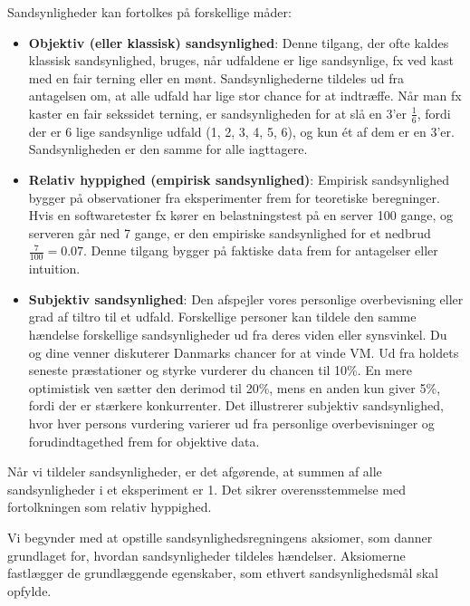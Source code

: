 Sandsynligheder kan fortolkes på forskellige måder:

\begin{itemize}
    \item \textbf{Objektiv (eller klassisk) sandsynlighed}: Denne tilgang, der ofte kaldes klassisk sandsynlighed, bruges, når udfaldene er lige sandsynlige, fx ved kast med en fair terning eller en mønt. Sandsynlighederne tildeles ud fra antagelsen om, at alle udfald har lige stor chance for at indtræffe. Når man fx kaster en fair sekssidet terning, er sandsynligheden for at slå en 3'er \( \frac{1}{6} \), fordi der er 6 lige sandsynlige udfald (1, 2, 3, 4, 5, 6), og kun ét af dem er en 3'er. Sandsynligheden er den samme for alle iagttagere.
        
    \item \textbf{Relativ hyppighed (empirisk sandsynlighed)}: Empirisk sandsynlighed bygger på observationer fra eksperimenter frem for teoretiske beregninger. Hvis en softwaretester fx kører en belastningstest på en server 100 gange, og serveren går ned 7 gange, er den empiriske sandsynlighed for et nedbrud \( \frac{7}{100} = 0.07 \). Denne tilgang bygger på faktiske data frem for antagelser eller intuition.
        
    \item \textbf{Subjektiv sandsynlighed}: Den afspejler vores personlige overbevisning eller grad af tiltro til et udfald. Forskellige personer kan tildele den samme hændelse forskellige sandsynligheder ud fra deres viden eller synsvinkel. Du og dine venner diskuterer Danmarks chancer for at vinde VM. Ud fra holdets seneste præstationer og styrke vurderer du chancen til 10\%. En mere optimistisk ven sætter den derimod til 20\%, mens en anden kun giver 5\%, fordi der er stærkere konkurrenter. Det illustrerer subjektiv sandsynlighed, hvor hver persons vurdering varierer ud fra personlige overbevisninger og forudindtagethed frem for objektive data.
    

\end{itemize}

Når vi tildeler sandsynligheder, er det afgørende, at summen af alle sandsynligheder i et eksperiment er 1. Det sikrer overensstemmelse med fortolkningen som relativ hyppighed.

Vi begynder med at opstille sandsynlighedsregningens aksiomer, som danner grundlaget for, hvordan sandsynligheder tildeles hændelser. Aksiomerne fastlægger de grundlæggende egenskaber, som ethvert sandsynlighedsmål skal opfylde.
    
